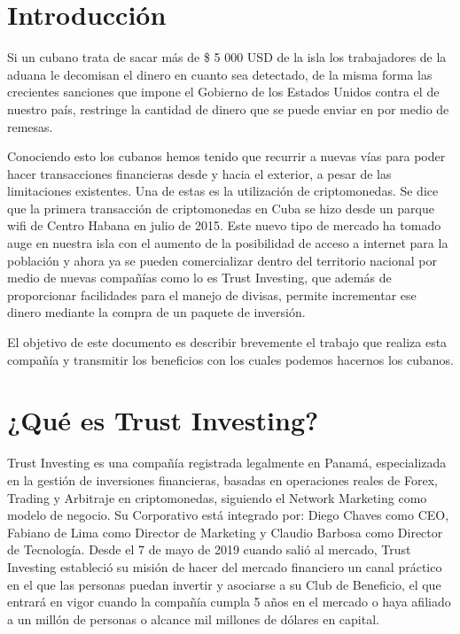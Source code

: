\documentclass[12pt,letterpaper]{article}
\begin{document}
	
	\begin{titlepage}
		 
	\end{titlepage}


	\tableofcontents
	\thispagestyle{empty}
	\newpage
	
	\section*{Introducción}
	\setcounter{page}{1}
	
	Si un cubano trata de sacar más de \$ 5 000 USD de la isla los trabajadores de la aduana le decomisan el dinero en cuanto sea detectado, de la misma forma las crecientes sanciones que impone el Gobierno de los Estados Unidos contra el de nuestro país, restringe la cantidad de dinero que se puede enviar en por medio de remesas.
	
	Conociendo esto los cubanos hemos tenido que recurrir a nuevas vías para poder hacer transacciones financieras desde y hacia el exterior, a pesar de las limitaciones existentes. Una de estas es la utilización de criptomonedas.
	Se dice que la primera transacción de criptomonedas en Cuba se hizo desde un parque wifi de Centro Habana en julio de 2015. Este nuevo tipo de mercado ha tomado auge en nuestra isla con el aumento de la posibilidad de acceso a internet para la población y ahora ya se pueden comercializar dentro del territorio nacional por medio de nuevas compañías como lo es Trust Investing, que además de proporcionar facilidades para el manejo de divisas, permite incrementar ese dinero mediante la compra de un paquete de inversión.
	
	El objetivo de este documento es describir brevemente el trabajo que realiza esta compañía y transmitir los beneficios con los cuales podemos hacernos los cubanos.
	
	
	
	\newpage
	\section{¿Qué es Trust Investing?}
	Trust Investing es una compañía registrada legalmente en Panamá, especializada en la gestión de inversiones financieras, basadas en operaciones reales de Forex, Trading y Arbitraje en criptomonedas, siguiendo el Network Marketing como modelo de negocio. Su Corporativo está integrado por: Diego Chaves como CEO, Fabiano de Lima como Director de Marketing y Claudio Barbosa como Director de Tecnología. Desde el 7 de mayo de 2019 cuando salió al mercado, Trust Investing estableció su misión de hacer del mercado financiero un canal práctico en el que las personas puedan invertir y asociarse a su Club de Beneficio, el que entrará en vigor cuando la compañía cumpla 5 años en el mercado o haya afiliado a un millón de personas o alcance mil millones de dólares en capital.
	
\end{document}
